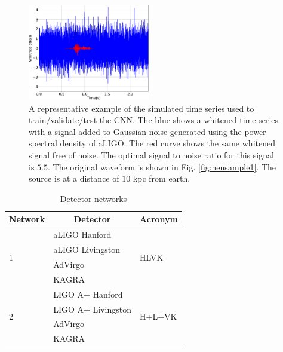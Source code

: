 \documentclass[aps,twocolumn,showpacs,groupedaddress, nofootinbib]{revtex4}  %
\begin{document}
%
%
\begin{figure}
\includegraphics[width=0.475\textwidth]{datasample.png}
\caption{A representative example of the simulated time series used to
train/validate/test the \ac{CNN}. The blue shows a whitened time series with a
signal added to Gaussian noise generated using the power spectral density of \ac{aLIGO}. 
The red curve shows the same whitened signal free of
noise. The optimal signal to noise ratio for this signal is $5.5$.
The original waveform is shown in Fig. \ref{fig:neusample1}.
The source is at a distance of $10$ kpc from earth.
\label{fig:sample}} 
\end{figure}

\begin{table}[]
\centering
\begin{threeparttable}
\caption{Detector networks}
\label{table:network}
\begin{tabular}{lll}
\toprule
Network            & \multicolumn{1}{c}{Detector}                & Acronym                 \\
\hline
\multirow{4}{*}{1} & \ac{aLIGO} Hanford~\cite{aasi2015advanced}    & \multirow{4}{*}{HLVK}   \\
                   & \ac{aLIGO} Livingston &                         \\
                   & \ac{AdVirgo}~\cite{acernese2014advanced}           &                         \\
                   & KAGRA~\cite{aso2013interferometer}                    &                         \\
                   \hline
\multirow{4}{*}{2} & LIGO A+ Hanford~\cite{miller2015prospects, LIGOW}          & \multirow{4}{*}{H+L+VK} \\
                   & LIGO A+ Livingston       &                         \\
                   & \ac{AdVirgo}           &                         \\
                   & KAGRA                    &                         \\
\hline
\hline
\end{tabular}
\begin{tablenotes}
\setlength{}
\end{tablenotes}
\end{threeparttable}
\end{table}
\end{document}
